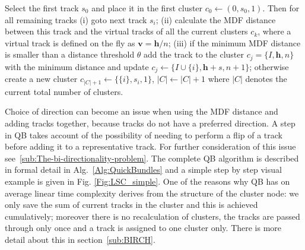 \documentclass[preprint,authoryear,a4paper,10pt,onecolumn]{elsarticle}
\begin{document}
Select the first track $s_{0}$ and place it in the first cluster
$c_{0}\leftarrow({0},s_{0},1)$. Then for all remaining tracks (i) goto
next track $s_{i}$; (ii) calculate the MDF distance between this track and
the virtual tracks of all the current clusters $c_{k}$, where a virtual track
is defined on the fly as $\mathbf{v}=\mathbf{h}/n$; (iii) if the minimum
MDF distance is smaller than a distance threshold
$\theta$ add the track to the cluster
$c_{j}=\{I,\mathbf{h},n\}$ with the minimum distance and update
$c_{j}\leftarrow\{I\cup\{i\},\mathbf{h}+s,n+1\}$; otherwise create a new
cluster $c_{|C|+1}\leftarrow\{\{i\},s_{i},1\}$, $|C|\leftarrow|C|+1$ where
$|C|$ denotes the current total number of clusters. 

Choice of direction can become an issue when using the MDF distance and
adding tracks together, because tracks do not have a preferred
direction.  A step in QB takes account of the possibility of needing to
perform a flip of a track before adding it to a representative
track. For further consideration of this issue
see~\ref{sub:The-bi-directionality-problem}. The complete QB algorithm
is described in formal detail in Alg.~\ref{Alg:QuickBundles} and a
simple step by step visual example is given in
Fig. \ref{Fig:LSC_simple}.  One of the reasons why QB has on average
linear time complexity derives from the structure of the cluster node:
we only save the sum of current tracks in the cluster and this is
achieved cumulatively; moreover there is no recalculation of clusters,
the tracks are passed through only once and a track is assigned to one
cluster only. There is more detail about this in
section~\ref{sub:BIRCH}.
\end{document}
